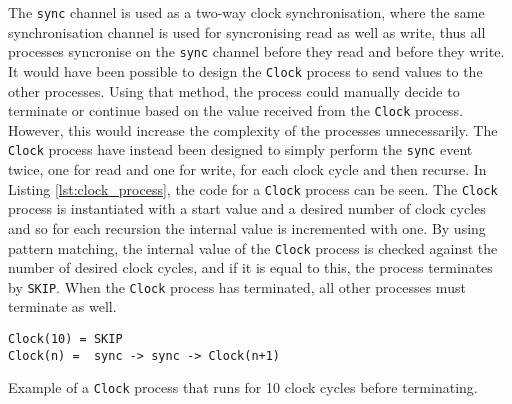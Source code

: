 The \texttt{sync} channel is used as a two-way clock synchronisation, where the same synchronisation channel is used for syncronising read as well as write, thus all processes syncronise on the \texttt{sync} channel before they read and before they write.
It would have been possible to design the \texttt{Clock} process to send values to the other processes. Using that method, the process could manually decide to terminate or continue based on the value received from the \texttt{Clock} process. However, this would increase the complexity of the processes unnecessarily. The \texttt{Clock} process have instead been designed to simply perform the \texttt{sync} event twice, one for read and one for write, for each clock cycle and then recurse. In Listing \ref{lst:clock_process}, the \cspm{} code for a \texttt{Clock} process can be seen. The \texttt{Clock} process is instantiated with a start value and a desired number of clock cycles and so for each recursion the internal value is incremented with one. By using pattern matching, the internal value of the \texttt{Clock} process is checked against the number of desired clock cycles, and if it is equal to this, the process terminates by \texttt{SKIP}. When the \texttt{Clock} process has terminated, all other processes must terminate as well.
\begin{listing}
\begin{verbatim}
Clock(10) = SKIP
Clock(n) =  sync -> sync -> Clock(n+1)
\end{verbatim}
\caption{Example of a \texttt{Clock} process that runs for 10 clock cycles before terminating. }
\label{lst:clock_process}
\end{listing}

